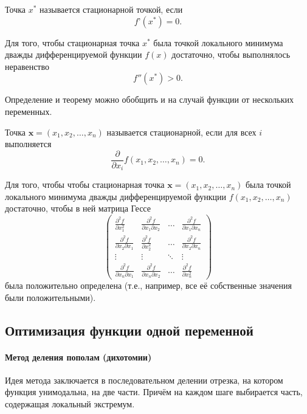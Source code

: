 \begin{defn}
Точка $x^{*}$ называется стационарной точкой, если
\[
f\text{'}(x^{*})=0.
\]
\end{defn}
\begin{thm}
Для того, чтобы стационарная точка $x^{*}$ была точкой локального
минимума дважды дифференцируемой функции $f(x)$ достаточно, чтобы
выполнялось неравенство
\[
f''(x^{*})>0.
\]

\end{thm}
Определение и теорему можно обобщить и на случай функции от нескольких
переменных.
\begin{defn}
Точка $\mathbf{x}=(x_{1},x_{2},\dots,x_{n})$ называется стационарной,
если для всех $i$ выполняется 
\[
\frac{\partial}{\partial x_{i}}f(x_{1},x_{2},\dots,x_{n})=0.
\]
\end{defn}
\begin{thm}
Для того, чтобы чтобы стационарная точка $\mathbf{x}=(x_{1},x_{2},\dots,x_{n})$
была точкой локального минимума дважды дифференцируемой функции $f(x_{1},x_{2},\dots,x_{n})$
достаточно, чтобы в ней матрица Гессе 
\[
\begin{pmatrix}\frac{\partial^{2}f}{\partial x_{1}^{2}} & \frac{\partial^{2}f}{\partial x_{1}\partial x_{2}} & \ldots & \frac{\partial^{2}f}{\partial x_{1}\partial x_{n}}\\
\frac{\partial^{2}f}{\partial x_{2}\partial x_{1}} & \frac{\partial^{2}f}{\partial x_{2}^{2}} & \ldots & \frac{\partial^{2}f}{\partial x_{2}\partial x_{n}}\\
\vdots & \vdots & \ddots & \vdots\\
\frac{\partial^{2}f}{\partial x_{n}\partial x_{1}} & \frac{\partial^{2}f}{\partial x_{n}\partial x_{2}} & \ldots & \frac{\partial^{2}f}{\partial x_{n}^{2}}
\end{pmatrix}
\]
была положительно определена (т.е., например, все её собственные значения
были положительными).
\end{thm}

\subsection{Оптимизация функции одной переменной}


\paragraph{Метод деления пополам (дихотомии)}

Идея метода заключается в последовательном делении отрезка, на котором
функция унимодальна, на две части. Причём на каждом шаге выбирается
часть, содержащая локальный экстремум.

